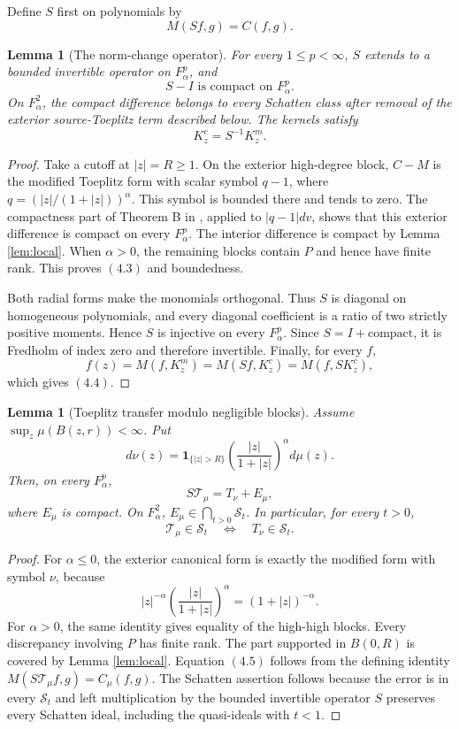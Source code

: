 \documentclass[11pt]{article}
\newtheorem{lemma}[theorem]{Lemma}
\newcommand{\Fc}[2]{F^{#1}_{#2}}
\newcommand{\Sc}{\mathcal S}
\newcommand{\Tc}{\mathcal T}
\newcommand{\Tm}{T}
\begin{document}
Define \(S\) first on polynomials by
\[
 M(Sf,g)=C(f,g).                                                    \tag{4.2}
\]

\begin{lemma}[The norm-change operator]\label{lem:S}
For every \(1\leq p<\infty\), \(S\) extends to a bounded invertible operator
on \(\Fc p\alpha\), and
\[
 S-I\text{ is compact on }\Fc p\alpha.                             \tag{4.3}
\]
On \(\Fc2\alpha\), the compact difference belongs to every Schatten class
after removal of the exterior source-Toeplitz term described below.
The kernels satisfy
\[
 K^c_z=S^{-1}K^m_z.                                                 \tag{4.4}
\]
\end{lemma}

\begin{proof}
Take a cutoff at \(|z|=R\geq1\).  On the exterior high-degree block,
\(C-M\) is the modified Toeplitz form with scalar symbol \(q-1\), where
\(q=(|z|/(1+|z|))^\alpha\).  This symbol is bounded there and tends to zero.
The compactness part of Theorem B in \cite{CIJ}, applied to \(|q-1|dv\),
shows that this exterior difference is compact on every \(\Fc p\alpha\).
The interior difference is compact by Lemma \ref{lem:local}.  When
\(\alpha>0\), the remaining blocks contain \(P\) and hence have finite rank.
This proves \((4.3)\) and boundedness.

Both radial forms make the monomials orthogonal.  Thus \(S\) is diagonal on
homogeneous polynomials, and every diagonal coefficient is a ratio of two
strictly positive moments.  Hence \(S\) is injective on every \(\Fc p\alpha\).
Since \(S=I+\text{compact}\), it is Fredholm of index zero and therefore
invertible.  Finally, for every \(f\),
\[
 f(z)=M(f,K^m_z)=M(Sf,K^c_z)=M(f,SK^c_z),
\]
which gives \((4.4)\).
\end{proof}

\begin{lemma}[Toeplitz transfer modulo negligible blocks]\label{lem:transfer}
Assume \(\sup_z\mu(B(z,r))<\infty\).  Put
\[
 d\nu(z)=\mathbf1_{\{|z|>R\}}
 \left(\frac{|z|}{1+|z|}\right)^\alpha d\mu(z).
\]
Then, on every \(\Fc p\alpha\),
\[
 S\Tc_\mu=\Tm_\nu+E_\mu,                                         \tag{4.5}
\]
where \(E_\mu\) is compact.  On \(\Fc2\alpha\),
\(E_\mu\in\bigcap_{t>0}\Sc_t\).  In particular, for every \(t>0\),
\[
 \Tc_\mu\in\Sc_t\quad\Longleftrightarrow\quad\Tm_\nu\in\Sc_t.\tag{4.6}
\]
\end{lemma}

\begin{proof}
For \(\alpha\leq0\), the exterior canonical form is exactly the modified
form with symbol \(\nu\), because
\[
 |z|^{-\alpha}\left(\frac{|z|}{1+|z|}\right)^\alpha
 =(1+|z|)^{-\alpha}.
\]
For \(\alpha>0\), the same identity gives equality of the high-high blocks.
Every discrepancy involving \(P\) has finite rank.  The part supported in
\(B(0,R)\) is covered by Lemma \ref{lem:local}.  Equation \((4.5)\) follows
from the defining identity \(M(S\Tc_\mu f,g)=C_\mu(f,g)\).
The Schatten assertion follows because the error is in every \(\Sc_t\) and
left multiplication by the bounded invertible operator \(S\) preserves every
Schatten ideal, including the quasi-ideals with \(t<1\).
\end{proof}
\end{document}
